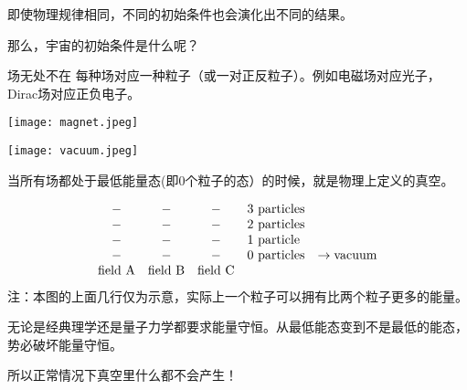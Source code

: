 \documentclass[CJK]{beamer}
\begin{document}
\begin{frame}
  \bch
  即使物理规律相同，不同的初始条件也会演化出不同的结果。

  \skiplines

  那么，宇宙的初始条件是什么呢？
  \ech
\end{frame}


\begin{frame}
\bch
\begin{minipage}{0.5\textwidth}
场无处不在
\skipline
每种场对应一种粒子（或一对正反粒子）。例如电磁场对应光子，Dirac场对应正负电子。
\end{minipage}
\begin{minipage}{0.4\textwidth}
\texttt{[image: magnet.jpeg]}
\end{minipage}
\ech
\end{frame}

\begin{frame}
\bch
\begin{minipage}{0.35\textwidth}
\texttt{[image: vacuum.jpeg]}
\end{minipage}\begin{minipage}{0.55\textwidth}
当所有场都处于最低能量态(即0个粒子的态）的时候，就是物理上定义的真空。
\end{minipage}

\skipline
\begin{equation}
\begin{array}{ccclr}
- & - & - & \mathrm{3\ particles} &\\
- & - & - & \mathrm{2\ particles}&\\
- & - & - & \mathrm{1\ particle} &\\
- & - & - & \mathrm{0\ particles}& \rightarrow {\bf \rm vacuum}\\ 
{\rm field\ A} & {\rm field\ B} & {\rm field\ C}
\end{array} \nonumber
\end{equation}
{\scriptsize
注：本图的上面几行仅为示意，实际上一个粒子可以拥有比两个粒子更多的能量。
}

\ech
\end{frame}

\begin{frame}
\bch

无论是经典理学还是量子力学都要求能量守恒。从最低能态变到不是最低的能态，势必破坏能量守恒。

\skipline
所以正常情况下真空里什么都不会产生！

\ech
\end{frame}
\end{document}
